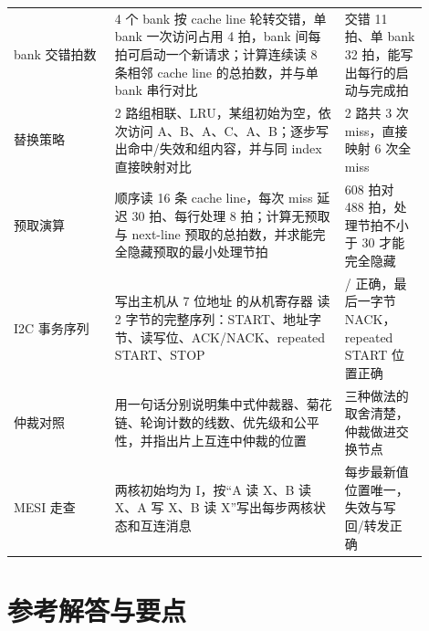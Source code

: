 \begin{longtable}{L{0.22\linewidth}L{0.5\linewidth}L{0.18\linewidth}}
bank 交错拍数 & 4 个 bank 按 cache line 轮转交错，单 bank 一次访问占用 4 拍，bank 间每拍可启动一个新请求；计算连续读 8 条相邻 cache line 的总拍数，并与单 bank 串行对比 & 交错 11 拍、单 bank 32 拍，能写出每行的启动与完成拍 \\
替换策略 & 2 路组相联、LRU，某组初始为空，依次访问 A、B、A、C、A、B；逐步写出命中/失效和组内容，并与同 index 直接映射对比 & 2 路共 3 次 miss，直接映射 6 次全 miss \\
预取演算 & 顺序读 16 条 cache line，每次 miss 延迟 30 拍、每行处理 8 拍；计算无预取与 next-line 预取的总拍数，并求能完全隐藏预取的最小处理节拍 & 608 拍对 488 拍，处理节拍不小于 30 才能完全隐藏 \\
I2C 事务序列 & 写出主机从 7 位地址  的从机寄存器  读 2 字节的完整序列：START、地址字节、读写位、ACK/NACK、repeated START、STOP & / 正确，最后一字节 NACK，repeated START 位置正确 \\
仲裁对照 & 用一句话分别说明集中式仲裁器、菊花链、轮询计数的线数、优先级和公平性，并指出片上互连中仲裁的位置 & 三种做法的取舍清楚，仲裁做进交换节点 \\
MESI 走查 & 两核初始均为 I，按“A 读 X、B 读 X、A 写 X、B 读 X”写出每步两核状态和互连消息 & 每步最新值位置唯一，失效与写回/转发正确 \\
\bottomrule
\end{longtable}

\section*{参考解答与要点}

